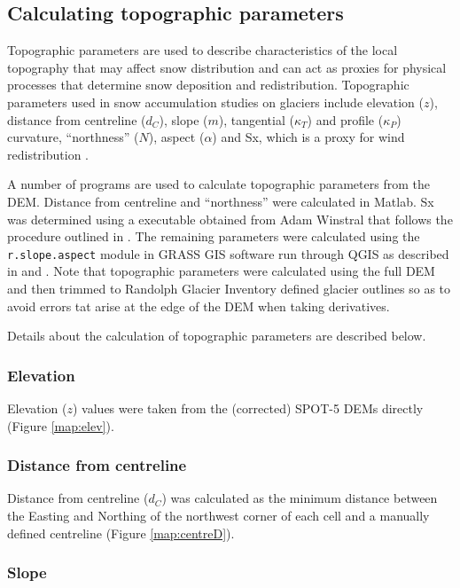 \documentclass{sfuthesis}
\begin{document}
\subsection{Calculating topographic parameters}
\label{sec:topoCalc}

Topographic parameters are used to describe characteristics of the local topography that may affect snow distribution and can act as proxies for physical processes that determine snow deposition and redistribution. Topographic parameters used in snow accumulation studies on glaciers include elevation ($z$), distance from centreline ($d_C$), slope ($m$), tangential ($\kappa_T$) and profile ($\kappa_P$) curvature, ``northness'' ($N$), aspect ($\alpha$) and Sx, which is a proxy for wind redistribution \citep{Basist1994, Revuelto2014, McGrath2015}.	
 
A number of programs are used to calculate topographic parameters from the DEM. Distance from centreline and ``northness'' were calculated in Matlab. Sx was determined using a executable obtained from Adam Winstral that follows the procedure outlined in \cite{Winstral2002}. The remaining parameters were calculated using the \texttt{r.slope.aspect} module in GRASS GIS software run through QGIS as described in \cite{Mitavsova1993} and \cite{Hofierka2009}. Note that topographic parameters were calculated using the full DEM and then trimmed to Randolph Glacier Inventory defined glacier outlines so as to avoid errors tat arise at the edge of the DEM when taking derivatives. 

Details about the calculation of topographic parameters are described below.
\subsubsection*{Elevation}

Elevation ($z$) values were taken from the (corrected) SPOT-5 DEMs directly (Figure \ref{map:elev}).

\subsubsection*{Distance from centreline}

Distance from centreline ($d_C$) was calculated as the minimum distance between the Easting and Northing of the northwest corner of each cell and a manually defined centreline (Figure \ref{map:centreD}). 


\subsubsection*{Slope} 
\end{document}
